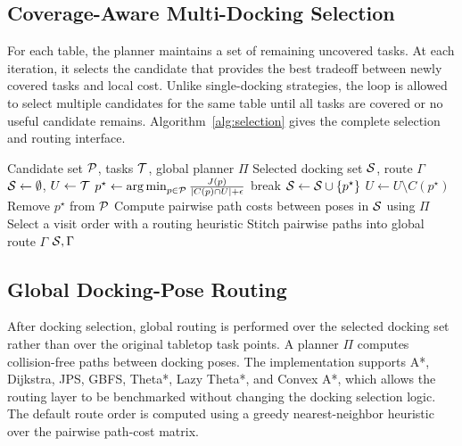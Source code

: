 \subsection{Coverage-Aware Multi-Docking Selection}
For each table, the planner maintains a set of remaining uncovered tasks. At each iteration, it selects the candidate that provides the best tradeoff between newly covered tasks and local cost. Unlike single-docking strategies, the loop is allowed to select multiple candidates for the same table until all tasks are covered or no useful candidate remains. Algorithm~\ref{alg:selection} gives the complete selection and routing interface.

\begin{algorithm}[t]
\caption{Multi-docking selection and global routing}
\label{alg:selection}
\begin{algorithmic}[1]
\REQUIRE Candidate set \(\mathcal{P}\), tasks \(\mathcal{T}\), global planner \(\Pi\)
\ENSURE Selected docking set \(\mathcal{S}\), route \(\Gamma\)
\STATE \(\mathcal{S}\leftarrow\emptyset\), \(U\leftarrow\mathcal{T}\)
    \STATE \(p^\star \leftarrow \operatorname*{arg\,min}_{p\in\mathcal{P}} \frac{J(p)}{|C(p)\cap U|+\epsilon}\)
        \STATE break
    \ENDIF
    \STATE \(\mathcal{S}\leftarrow\mathcal{S}\cup\{p^\star\}\)
    \STATE \(U\leftarrow U\setminus C(p^\star)\)
    \STATE Remove \(p^\star\) from \(\mathcal{P}\)
\ENDWHILE
\STATE Compute pairwise path costs between poses in \(\mathcal{S}\) using \(\Pi\)
\STATE Select a visit order with a routing heuristic
\STATE Stitch pairwise paths into global route \(\Gamma\)
\RETURN \(\mathcal{S},\Gamma\)
\end{algorithmic}
\end{algorithm}

\subsection{Global Docking-Pose Routing}
After docking selection, global routing is performed over the selected docking set rather than over the original tabletop task points. A planner \(\Pi\) computes collision-free paths between docking poses. The implementation supports A*, Dijkstra, JPS, GBFS, Theta*, Lazy Theta*, and Convex A*, which allows the routing layer to be benchmarked without changing the docking selection logic. The default route order is computed using a greedy nearest-neighbor heuristic over the pairwise path-cost matrix.
